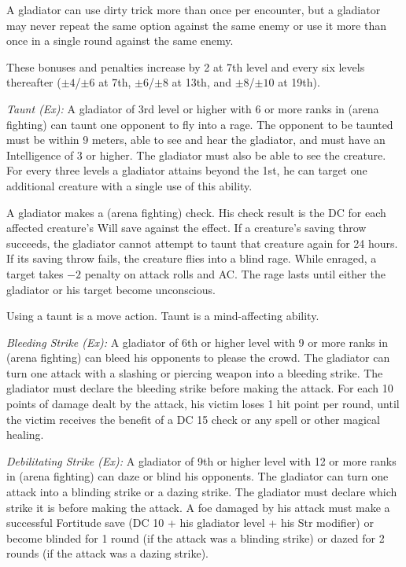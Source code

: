 A gladiator can use dirty trick more than once per encounter, but a gladiator may never repeat the same option against the same enemy or use it more than once in a single round against the same enemy.

These bonuses and penalties increase by 2 at 7th level and every six levels thereafter ($\pm4$/$\pm6$ at 7th, $\pm6$/$\pm8$ at 13th, and $\pm8$/$\pm10$ at 19th).


\textit{Taunt (Ex):} A gladiator of 3rd level or higher with 6 or more ranks in  (arena fighting) can taunt one opponent to fly into a rage. The opponent to be taunted must be within 9 meters, able to see and hear the gladiator, and must have an Intelligence of 3 or higher. The gladiator must also be able to see the creature. For every three levels a gladiator attains beyond the 1st, he can target one additional creature with a single use of this ability.

A gladiator makes a  (arena fighting) check. His check result is the DC for each affected creature's Will save against the effect. If a creature's saving throw succeeds, the gladiator cannot attempt to taunt that creature again for 24 hours. If its saving throw fails, the creature flies into a blind rage. While enraged, a target takes $-2$ penalty on attack rolls and AC. The rage lasts until either the gladiator or his target become unconscious.

Using a taunt is a move action. Taunt is a mind-affecting ability.

\textit{Bleeding Strike (Ex):} A gladiator of 6th or higher level with 9 or more ranks in  (arena fighting) can bleed his opponents to please the crowd. The gladiator can turn one attack with a slashing or piercing weapon into a bleeding strike. The gladiator must declare the bleeding strike before making the attack. For each 10 points of damage dealt by the attack, his victim loses 1 hit point per round, until the victim receives the benefit of a DC 15  check or any  spell or other magical healing.

\textit{Debilitating Strike (Ex):} A gladiator of 9th or higher level with 12 or more ranks in  (arena fighting) can daze or blind his opponents. The gladiator can turn one attack into a blinding strike or a dazing strike. The gladiator must declare which strike it is before making the attack. A foe damaged by his attack must make a successful Fortitude save (DC 10 + \onehalf his gladiator level + his Str modifier) or become blinded for 1 round (if the attack was a blinding strike) or dazed for 2 rounds (if the attack was a dazing strike).

